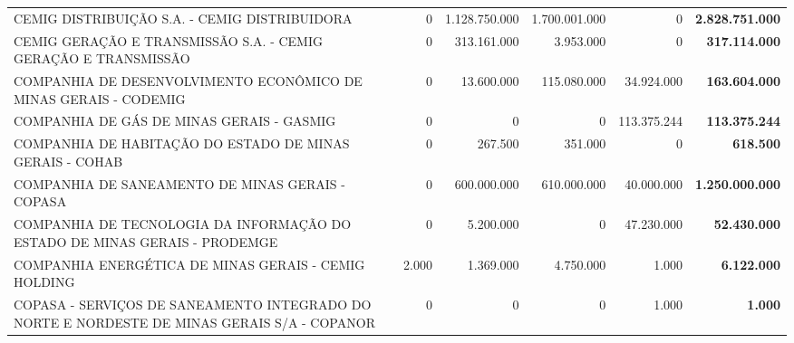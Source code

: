 \documentclass{article}
\begin{document}
\begin{longtable}[c]{m{5cm}|m{2.5cm}|m{2.5cm}|m{2.5cm}|m{2cm}|m{2cm}}
\multicolumn{1}{L{5cm}|}{CEMIG DISTRIBUIÇÃO S.A. - CEMIG DISTRIBUIDORA} & \multicolumn{1}{r|}{         0} & \multicolumn{1}{r|}{1.128.750.000} & \multicolumn{1}{r|}{1.700.001.000} & \multicolumn{1}{r|}{          0} & \multicolumn{1}{r}{ \textbf{2.828.751.000}} \\
\multicolumn{1}{L{5cm}|}{CEMIG GERAÇÃO E TRANSMISSÃO S.A. - CEMIG GERAÇÃO E TRANSMISSÃO} & \multicolumn{1}{r|}{         0} & \multicolumn{1}{r|}{313.161.000} & \multicolumn{1}{r|}{3.953.000} & \multicolumn{1}{r|}{          0} & \multicolumn{1}{r}{ \textbf{317.114.000}} \\
\multicolumn{1}{L{5cm}|}{COMPANHIA DE DESENVOLVIMENTO ECONÔMICO DE MINAS GERAIS - CODEMIG} & \multicolumn{1}{r|}{         0} & \multicolumn{1}{r|}{13.600.000} & \multicolumn{1}{r|}{115.080.000} & \multicolumn{1}{r|}{34.924.000} & \multicolumn{1}{r}{ \textbf{163.604.000}} \\
\multicolumn{1}{L{5cm}|}{COMPANHIA DE GÁS DE MINAS GERAIS - GASMIG} & \multicolumn{1}{r|}{         0} & \multicolumn{1}{r|}{            0} & \multicolumn{1}{r|}{            0} & \multicolumn{1}{r|}{113.375.244} & \multicolumn{1}{r}{ \textbf{113.375.244}} \\
\multicolumn{1}{L{5cm}|}{COMPANHIA DE HABITAÇÃO DO ESTADO DE MINAS GERAIS - COHAB} & \multicolumn{1}{r|}{         0} & \multicolumn{1}{r|}{267.500} & \multicolumn{1}{r|}{351.000} & \multicolumn{1}{r|}{          0} & \multicolumn{1}{r}{ \textbf{618.500}} \\
\multicolumn{1}{L{5cm}|}{COMPANHIA DE SANEAMENTO DE MINAS GERAIS - COPASA} & \multicolumn{1}{r|}{         0} & \multicolumn{1}{r|}{600.000.000} & \multicolumn{1}{r|}{610.000.000} & \multicolumn{1}{r|}{40.000.000} & \multicolumn{1}{r}{ \textbf{1.250.000.000}} \\
\multicolumn{1}{L{5cm}|}{COMPANHIA DE TECNOLOGIA DA INFORMAÇÃO DO ESTADO DE MINAS GERAIS - PRODEMGE} & \multicolumn{1}{r|}{         0} & \multicolumn{1}{r|}{5.200.000} & \multicolumn{1}{r|}{            0} & \multicolumn{1}{r|}{47.230.000} & \multicolumn{1}{r}{ \textbf{52.430.000}} \\
\multicolumn{1}{L{5cm}|}{COMPANHIA ENERGÉTICA DE MINAS GERAIS - CEMIG HOLDING} & \multicolumn{1}{r|}{2.000} & \multicolumn{1}{r|}{1.369.000} & \multicolumn{1}{r|}{4.750.000} & \multicolumn{1}{r|}{1.000} & \multicolumn{1}{r}{ \textbf{6.122.000}} \\
\multicolumn{1}{L{5cm}|}{COPASA - SERVIÇOS DE SANEAMENTO INTEGRADO DO NORTE E NORDESTE DE MINAS GERAIS S/A - COPANOR} & \multicolumn{1}{r|}{         0} & \multicolumn{1}{r|}{            0} & \multicolumn{1}{r|}{            0} & \multicolumn{1}{r|}{1.000} & \multicolumn{1}{r}{ \textbf{1.000}} \\

\end{longtable}
\end{document}
